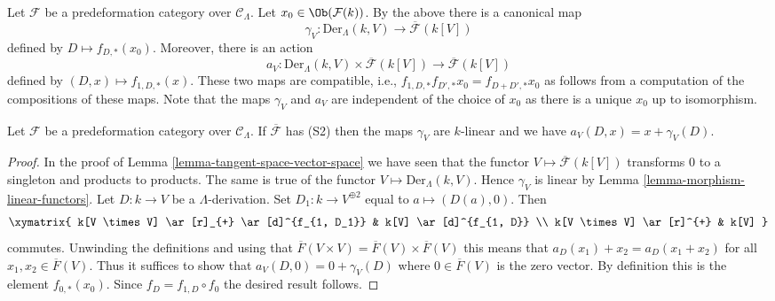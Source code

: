 \medskip\noindent
Let $\mathcal{F}$ be a predeformation category over $\mathcal{C}_\Lambda$.
Let $x_0 \in \Ob(\mathcal{F}(k))$. By the above there is a canonical
map
$$
\gamma_V :
\text{Der}_\Lambda(k, V)
\longrightarrow
\overline{\mathcal{F}}(k[V])
$$
defined by $D \mapsto f_{D, *}(x_0)$. Moreover, there is an action
$$
a_V : \text{Der}_\Lambda(k, V) \times \overline{\mathcal{F}}(k[V])
\longrightarrow
\overline{\mathcal{F}}(k[V])
$$
defined by $(D, x) \mapsto f_{1, D, *}(x)$. These two maps are compatible,
i.e., $f_{1, D, *}f_{D', *}x_0 = f_{D + D', *}x_0$ as follows from a
computation of the compositions of these maps. Note that the maps
$\gamma_V$ and $a_V$ are independent of the choice of $x_0$ as there
is a unique $x_0$ up to isomorphism.

\begin{lemma}
\label{lemma-action-linear}
Let $\mathcal{F}$ be a predeformation category over $\mathcal{C}_\Lambda$.
If $\overline{\mathcal{F}}$ has (S2) then the maps $\gamma_V$ are
$k$-linear and we have $a_V(D, x) = x + \gamma_V(D)$.
\end{lemma}

\begin{proof}
In the proof of
Lemma \ref{lemma-tangent-space-vector-space}
we have seen that the functor $V \mapsto \overline{\mathcal{F}}(k[V])$
transforms $0$ to a singleton and products to products. The same is
true of the functor $V \mapsto \text{Der}_\Lambda(k, V)$.
Hence $\gamma_V$ is linear by
Lemma \ref{lemma-morphism-linear-functors}.
Let $D : k \to V$ be a $\Lambda$-derivation.
Set $D_1 : k \to V^{\oplus 2}$ equal to $a \mapsto (D(a), 0)$.
Then
$$
\xymatrix{
k[V \times V] \ar[r]_{+} \ar[d]^{f_{1, D_1}} & k[V] \ar[d]^{f_{1, D}} \\
k[V \times V] \ar[r]^{+} & k[V]
}
$$
commutes. Unwinding the definitions and using that
$\overline{F}(V \times V) = \overline{F}(V) \times \overline{F}(V)$
this means that $a_D(x_1) + x_2 = a_D(x_1 + x_2)$ for all
$x_1, x_2 \in \overline{F}(V)$. Thus it suffices to show that
$a_V(D, 0) = 0 + \gamma_V(D)$ where $0 \in \overline{F}(V)$ is
the zero vector. By definition this is the element $f_{0, *}(x_0)$.
Since $f_D = f_{1, D} \circ f_0$ the desired result follows.
\end{proof}

